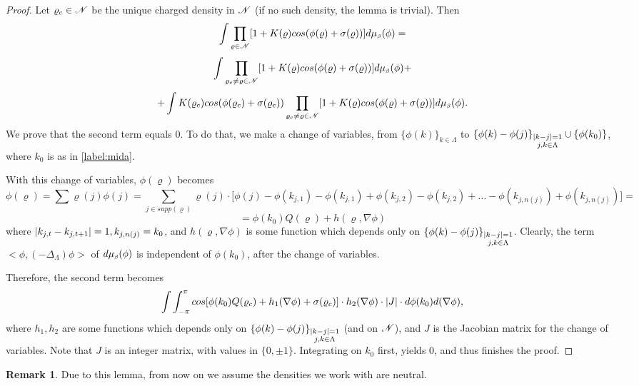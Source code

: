 \documentclass[11pt,reqno]{article}
\DeclarePairedDelimiter\abs{\lvert}{\rvert}%
\theoremstyle{definition}
\newtheorem*{remark}{Remark}
\numberwithin{equation}{section}
\begin{document}
\begin{proof}
Let $\varrho_c \in \mathscr{N}$ be the unique charged density in $\mathscr{N}$ (if no such density, the lemma is trivial). Then
$$
\int\prod_{\varrho \in \mathscr{N}}[1 + K(\varrho)cos(\phi(\varrho) + \sigma(\varrho))]d\mu_{\text{\tiny$\beta$}}(\phi) = 
$$
$$
\int\prod_{\varrho_c \neq \varrho \in \mathscr{N}}[1 + K(\varrho)cos(\phi(\varrho) + \sigma(\varrho))]d\mu_{\text{\tiny$\beta$}}(\phi) + 
$$
$$
+ \int K(\varrho_c)cos(\phi(\varrho_c) + \sigma(\varrho_c))\prod_{\varrho_c \neq \varrho \in \mathscr{N}}[1 + K(\varrho)cos(\phi(\varrho) + \sigma(\varrho))]d\mu_{\text{\tiny$\beta$}}(\phi).
$$
We prove that the second term equals $0$. To do that, we make a change of variables, from $\{\phi(k)\}_{k \in \Lambda}$ to $\{\phi(k)-\phi(j)\}_{\substack{\abs{k - j} = 1 \\ j,k \in \Lambda}} \cup \{\phi(k_0)\}$, where $k_0$ is as in \eqref{label:mida}. 

With this change of variables, $\phi(\varrho)$ becomes
$$
\phi(\varrho)=\sum\varrho(j)\phi(j) = \sum_{j \in supp(\varrho)}\varrho(j) \cdot \big[\phi(j) - \phi(k_{j,1}) - \phi(k_{j,1}) + \phi(k_{j,2}) - \phi(k_{j,2}) + \ldots - \phi(k_{j,n(j)}) + \phi(k_{j,n(j)})\big] = 
$$
$$
= \phi(k_0) Q(\varrho) + h(\varrho, \nabla\phi)
$$
where $\abs{k_{j,t} - k_{j,t+1}} = 1, k_{j,n(j)}=k_0$, and $h(\varrho, \nabla\phi)$ is some function which depends only on $\{\phi(k)-\phi(j)\}_{\substack{\abs{k - j} = 1 \\ j,k \in \Lambda}}$.
Clearly, the term $<\phi, (-\Delta_\Lambda)\phi>$ of $d\mu_{\text{\tiny$\beta$}}(\phi)$ is independent of $\phi(k_0)$, after the change of variables.

Therefore, the second term becomes
$$
\int \int_{-\pi}^{\pi} cos[\phi(k_0)Q(\varrho_c) + h_1(\nabla\phi) + \sigma(\varrho_c)] \cdot h_2(\nabla\phi) \cdot\abs{J}\cdot d\phi(k_0)d(\nabla\phi),
$$
where $h_1, h_2$ are some functions which depends only on $\{\phi(k)-\phi(j)\}_{\substack{\abs{k - j} = 1 \\ j,k \in \Lambda}}$ (and on $\mathscr{N}$), and $J$ is the Jacobian matrix for the change of variables. Note that $J$ is an integer matrix, with values in $\{0,\pm 1\}$. Integrating on $k_0$ first, yields 0, and thus finishes the proof.
\end{proof}

\begin{remark}
Due to this lemma, from now on we assume the densities we work with are neutral.
\end{remark}
\end{document}
